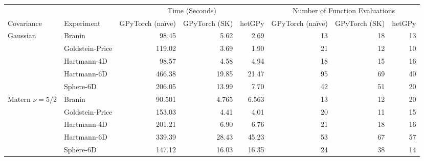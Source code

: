 \documentclass{standalone}
\begin{document}
\begin{tabular}{llrrrrrr}
\toprule
 &  & \multicolumn{3}{c}{Time (Seconds)} & \multicolumn{3}{c}{Number of Function Evaluations} \\ \cmidrule(lr){3-5} \cmidrule(lr){6-8}
 Covariance & Experiment & GPyTorch (na\"ive) & GPyTorch (SK) & hetGPy & GPyTorch (na\"ive) & GPyTorch (SK) & hetGPy \\
\midrule
\multirow[t]{5}{*}{Gaussian} & Branin & 98.45 & 5.62 & 2.69 & 13 & 18 & 13 \\
 & Goldstein-Price & 119.02 & 3.69 & 1.90 & 21 & 12 & 10 \\
 & Hartmann-4D & 98.57 & 4.58 & 4.94 & 18 & 15 & 16 \\
 & Hartmann-6D & 466.38 & 19.85 & 21.47 & 95 & 69 & 40 \\
 & Sphere-6D & 206.05 & 13.99 & 7.70 & 42 & 51 & 20 \\
\cline{1-8}
\multirow[t]{5}{*}{Matern $\nu = 5/2$} & Branin & 90.501 & 4.765 & 6.563 & 13 & 12 & 20 \\
 & Goldstein-Price & 153.03 & 4.41 & 4.01 & 20 & 11 & 15 \\
 & Hartmann-4D & 201.21 & 6.90 & 6.76 & 21 & 18 & 16 \\
 & Hartmann-6D & 339.39 & 28.43 & 45.23 & 53 & 67 & 57 \\
 & Sphere-6D & 147.12 & 16.03 & 16.35 & 24 & 38 & 14 \\
\bottomrule
\end{tabular}
\end{document}
